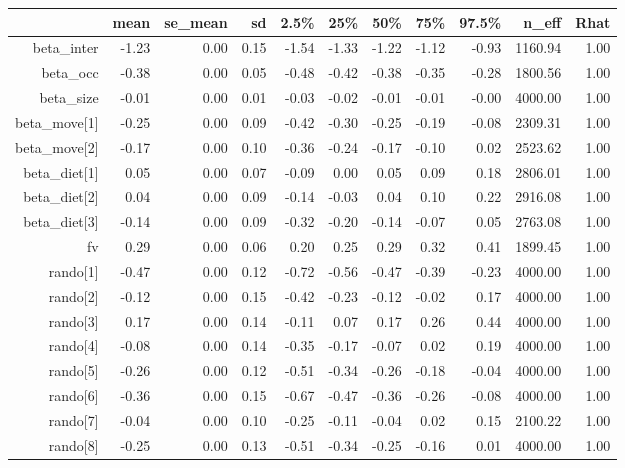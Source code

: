 \begin{table}[ht]
\centering
\begin{tabular}{rrrrrrrrrrr}
  \hline
 & mean & se\_mean & sd & 2.5\% & 25\% & 50\% & 75\% & 97.5\% & n\_eff & Rhat \\ 
  \hline
beta\_inter & -1.23 & 0.00 & 0.15 & -1.54 & -1.33 & -1.22 & -1.12 & -0.93 & 1160.94 & 1.00 \\ 
  beta\_occ & -0.38 & 0.00 & 0.05 & -0.48 & -0.42 & -0.38 & -0.35 & -0.28 & 1800.56 & 1.00 \\ 
  beta\_size & -0.01 & 0.00 & 0.01 & -0.03 & -0.02 & -0.01 & -0.01 & -0.00 & 4000.00 & 1.00 \\ 
  beta\_move[1] & -0.25 & 0.00 & 0.09 & -0.42 & -0.30 & -0.25 & -0.19 & -0.08 & 2309.31 & 1.00 \\ 
  beta\_move[2] & -0.17 & 0.00 & 0.10 & -0.36 & -0.24 & -0.17 & -0.10 & 0.02 & 2523.62 & 1.00 \\ 
  beta\_diet[1] & 0.05 & 0.00 & 0.07 & -0.09 & 0.00 & 0.05 & 0.09 & 0.18 & 2806.01 & 1.00 \\ 
  beta\_diet[2] & 0.04 & 0.00 & 0.09 & -0.14 & -0.03 & 0.04 & 0.10 & 0.22 & 2916.08 & 1.00 \\ 
  beta\_diet[3] & -0.14 & 0.00 & 0.09 & -0.32 & -0.20 & -0.14 & -0.07 & 0.05 & 2763.08 & 1.00 \\ 
  fv & 0.29 & 0.00 & 0.06 & 0.20 & 0.25 & 0.29 & 0.32 & 0.41 & 1899.45 & 1.00 \\ 
  rando[1] & -0.47 & 0.00 & 0.12 & -0.72 & -0.56 & -0.47 & -0.39 & -0.23 & 4000.00 & 1.00 \\ 
  rando[2] & -0.12 & 0.00 & 0.15 & -0.42 & -0.23 & -0.12 & -0.02 & 0.17 & 4000.00 & 1.00 \\ 
  rando[3] & 0.17 & 0.00 & 0.14 & -0.11 & 0.07 & 0.17 & 0.26 & 0.44 & 4000.00 & 1.00 \\ 
  rando[4] & -0.08 & 0.00 & 0.14 & -0.35 & -0.17 & -0.07 & 0.02 & 0.19 & 4000.00 & 1.00 \\ 
  rando[5] & -0.26 & 0.00 & 0.12 & -0.51 & -0.34 & -0.26 & -0.18 & -0.04 & 4000.00 & 1.00 \\ 
  rando[6] & -0.36 & 0.00 & 0.15 & -0.67 & -0.47 & -0.36 & -0.26 & -0.08 & 4000.00 & 1.00 \\ 
  rando[7] & -0.04 & 0.00 & 0.10 & -0.25 & -0.11 & -0.04 & 0.02 & 0.15 & 2100.22 & 1.00 \\ 
  rando[8] & -0.25 & 0.00 & 0.13 & -0.51 & -0.34 & -0.25 & -0.16 & 0.01 & 4000.00 & 1.00 \\ 

\end{tabular}
\end{table}
